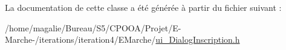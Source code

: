 La documentation de cette classe a été générée à partir du fichier suivant \-:\begin{DoxyCompactItemize}
\item 
/home/magalie/\-Bureau/\-S5/\-C\-P\-O\-O\-A/\-Projet/\-E-\/\-Marche-\//iterations/iteration4/\-E\-Marche/\hyperlink{ui___dialog_inscription_8h}{ui\-\_\-\-Dialog\-Inscription.\-h}\end{DoxyCompactItemize}
